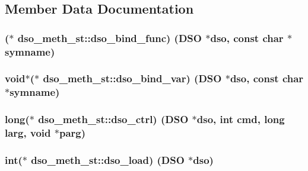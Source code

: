\subsection{Member Data Documentation}
\subsubsection[{\texorpdfstring{dso\+\_\+bind\+\_\+func}{dso_bind_func}}]{($\ast$ dso\+\_\+meth\+\_\+st\+::dso\+\_\+bind\+\_\+func) ({\bf D\+SO} $\ast$dso, const char $\ast$symname)}\hypertarget{structdso__meth__st_a6a179a5a759e8d6837055f217848e3db}{}\label{structdso__meth__st_a6a179a5a759e8d6837055f217848e3db}
\subsubsection[{\texorpdfstring{dso\+\_\+bind\+\_\+var}{dso_bind_var}}]{\setlength{\rightskip}{0pt plus 5cm}void$\ast$($\ast$ dso\+\_\+meth\+\_\+st\+::dso\+\_\+bind\+\_\+var) ({\bf D\+SO} $\ast$dso, const char $\ast$symname)}\hypertarget{structdso__meth__st_a64e053582cae745cef5ff6643b8258cb}{}\label{structdso__meth__st_a64e053582cae745cef5ff6643b8258cb}
\subsubsection[{\texorpdfstring{dso\+\_\+ctrl}{dso_ctrl}}]{\setlength{\rightskip}{0pt plus 5cm}long($\ast$ dso\+\_\+meth\+\_\+st\+::dso\+\_\+ctrl) ({\bf D\+SO} $\ast$dso, int cmd, long larg, void $\ast$parg)}\hypertarget{structdso__meth__st_abc9ee5fe4894fa7bd80d37e1d20393ec}{}\label{structdso__meth__st_abc9ee5fe4894fa7bd80d37e1d20393ec}
\subsubsection[{\texorpdfstring{dso\+\_\+load}{dso_load}}]{\setlength{\rightskip}{0pt plus 5cm}int($\ast$ dso\+\_\+meth\+\_\+st\+::dso\+\_\+load) ({\bf D\+SO} $\ast$dso)}\hypertarget{structdso__meth__st_ad0931e27df22d21228272993683488b8}{}\label{structdso__meth__st_ad0931e27df22d21228272993683488b8}

